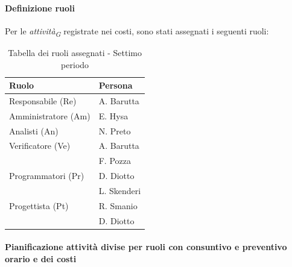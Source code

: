 \paragraph{Definizione ruoli}
Per le \textit{attività}\textsubscript{\textit{G}} registrate nei costi, sono stati assegnati i seguenti ruoli: 

\vspace{0.4cm}

\begin{table}[H]
    \centering
    \begin{tabular}{|L{4cm}|L{2cm}|}
        \hline
        \textbf{Ruolo} & \textbf{Persona} \\
        \hline
        \hline
        Responsabile (Re)   & A. Barutta \\
        \hline
        Amministratore (Am) & E. Hysa \\
        \hline
        Analisti (An)    & N. Preto \\
        \hline
        Verificatore (Ve)   & A. Barutta \\
                            & F. Pozza \\
        \hline
        Programmatori (Pr)  & D. Diotto\\
                            & L. Skenderi \\
        \hline
        Progettista (Pt)    & R. Smanio \\
                            & D. Diotto \\
        \hline
    \end{tabular}
    \caption{Tabella dei ruoli assegnati - Settimo periodo}
    \label{tab:Ruoli_persone_7}
    \end{table}

\newpage
\paragraph{Pianificazione attività divise per ruoli con consuntivo e preventivo orario e dei costi}

\vspace{0.4cm}

